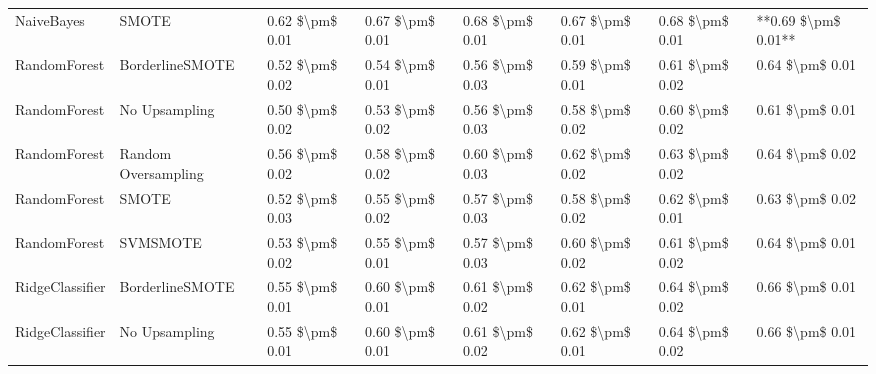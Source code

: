 \begin{tabular}{llllllll}
                     NaiveBayes &                         SMOTE & 0.62 \$\textbackslash pm\$ 0.01 &           0.67 \$\textbackslash pm\$ 0.01 &       0.68 \$\textbackslash pm\$ 0.01 &        0.67 \$\textbackslash pm\$ 0.01 &                         0.68 \$\textbackslash pm\$ 0.01 & **0.69 \$\textbackslash pm\$ 0.01** \\
                   RandomForest &               BorderlineSMOTE & 0.52 \$\textbackslash pm\$ 0.02 &           0.54 \$\textbackslash pm\$ 0.01 &       0.56 \$\textbackslash pm\$ 0.03 &        0.59 \$\textbackslash pm\$ 0.01 &                         0.61 \$\textbackslash pm\$ 0.02 &     0.64 \$\textbackslash pm\$ 0.01 \\
                   RandomForest &                 No Upsampling & 0.50 \$\textbackslash pm\$ 0.02 &           0.53 \$\textbackslash pm\$ 0.02 &       0.56 \$\textbackslash pm\$ 0.03 &        0.58 \$\textbackslash pm\$ 0.02 &                         0.60 \$\textbackslash pm\$ 0.02 &     0.61 \$\textbackslash pm\$ 0.01 \\
                   RandomForest &           Random Oversampling & 0.56 \$\textbackslash pm\$ 0.02 &           0.58 \$\textbackslash pm\$ 0.02 &       0.60 \$\textbackslash pm\$ 0.03 &        0.62 \$\textbackslash pm\$ 0.02 &                         0.63 \$\textbackslash pm\$ 0.02 &     0.64 \$\textbackslash pm\$ 0.02 \\
                   RandomForest &                         SMOTE & 0.52 \$\textbackslash pm\$ 0.03 &           0.55 \$\textbackslash pm\$ 0.02 &       0.57 \$\textbackslash pm\$ 0.03 &        0.58 \$\textbackslash pm\$ 0.02 &                         0.62 \$\textbackslash pm\$ 0.01 &     0.63 \$\textbackslash pm\$ 0.02 \\
                   RandomForest &                      SVMSMOTE & 0.53 \$\textbackslash pm\$ 0.02 &           0.55 \$\textbackslash pm\$ 0.01 &       0.57 \$\textbackslash pm\$ 0.03 &        0.60 \$\textbackslash pm\$ 0.02 &                         0.61 \$\textbackslash pm\$ 0.02 &     0.64 \$\textbackslash pm\$ 0.01 \\
                RidgeClassifier &               BorderlineSMOTE & 0.55 \$\textbackslash pm\$ 0.01 &           0.60 \$\textbackslash pm\$ 0.01 &       0.61 \$\textbackslash pm\$ 0.02 &        0.62 \$\textbackslash pm\$ 0.01 &                         0.64 \$\textbackslash pm\$ 0.02 &     0.66 \$\textbackslash pm\$ 0.01 \\
                RidgeClassifier &                 No Upsampling & 0.55 \$\textbackslash pm\$ 0.01 &           0.60 \$\textbackslash pm\$ 0.01 &       0.61 \$\textbackslash pm\$ 0.02 &        0.62 \$\textbackslash pm\$ 0.01 &                         0.64 \$\textbackslash pm\$ 0.02 &     0.66 \$\textbackslash pm\$ 0.01 \\

\end{tabular}
